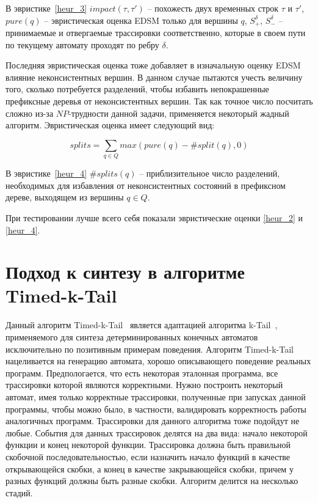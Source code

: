 \documentclass[times,specification,annotation]{itmo-student-thesis}
\begin{document}
В эвристике~\ref{heur_3} $impact(\tau, \tau')$ -- похожесть двух временных строк $\tau$ и $\tau'$, $pure(q)$ -- эвристическая оценка EDSM только для вершины $q$, 
$S^\delta_+$, $S^\delta_-$ -- принимаемые и отвергаемые трассировки соответственно, которые в своем пути по текущему автомату проходят по ребру $\delta$.

Последняя эвристическая оценка тоже добавляет в изначальную оценку EDSM влияние неконсистентных вершин. В данном случае пытаются учесть величину того,
сколько потребуется разделений, чтобы избавить непокрашенные префиксные деревья от неконсистентных вершин. Так как точное число посчитать сложно из-за $NP$-трудности
данной задачи, применяется некоторый жадный алгоритм. Эвристическая оценка имеет следующий вид:

\begin{equation}
  splits = \mathop{\sum}\limits_{q \in Q}max(pure(q) - \#split(q), 0)
  \label{heur_4}
\end{equation}

В эвристике~\ref{heur_4} $\#splits(q)$ -- приблизительное число разделений, необходимых для избавления от неконсистентных состояний в префиксном дереве, выходящем из вершины $q \in Q$.

При тестировании лучше всего себя показали эвристические оценки \ref{heur_2} и \ref{heur_4}.

\section{Подход к синтезу в алгоритме Timed-k-Tail}

Данный алгоритм Timed-k-Tail~\cite{timed-k-tail} является адаптацией алгоритма k-Tail~\cite{k-tail}, применяемого для синтеза детерминированных конечных автоматов 
исключительно по позитивным примерам поведения. 
Алгоритм Timed-k-Tail нацеливается на генерацию автомата, хорошо описывающего поведение реальных программ. Предпологается, что есть некоторая эталонная программа, 
все трассировки которой являются корректными. Нужно построить некоторый автомат, имея только корректные трассировки, полученные при запусках данной программы, чтобы
можно было, в частности, валидировать корректность работы аналогичных программ. Трассировки для данного алгоритма тоже подойдут не любые.
События для данных трассировок делятся на два вида: начало некоторой функции и конец некоторой функции. Трассировка должна быть правильной скобочной последовательностью, если назначить 
начало функций в качестве открывающейся скобки, а конец в качестве закрывающейся скобки, причем у разных функций должны быть разные скобки.
Алгоритм делится на несколько стадий.
\end{document}
